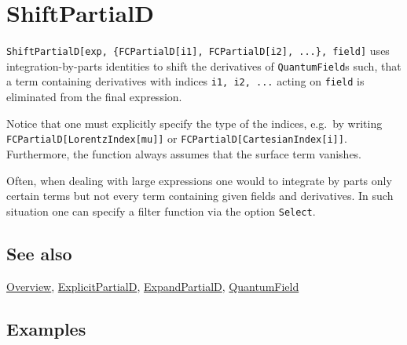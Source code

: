 \documentclass[../FeynCalcManual.tex]{subfiles}
\begin{document}
\hypertarget{shiftpartiald}{
\section{ShiftPartialD}\label{shiftpartiald}}

\texttt{ShiftPartialD[\allowbreak{}exp,\ \allowbreak{}\{\allowbreak{}FCPartialD[\allowbreak{}i1],\ \allowbreak{}FCPartialD[\allowbreak{}i2],\ \allowbreak{}...\},\ \allowbreak{}field]}
uses integration-by-parts identities to shift the derivatives of
\texttt{QuantumField}s such, that a term containing derivatives with
indices \texttt{i1,\ \allowbreak{}i2,\ \allowbreak{}...} acting on
\texttt{field} is eliminated from the final expression.

Notice that one must explicitly specify the type of the indices, e.g.~by
writing \texttt{FCPartialD[\allowbreak{}LorentzIndex[\allowbreak{}mu]]}
or \texttt{FCPartialD[\allowbreak{}CartesianIndex[\allowbreak{}i]]}.
Furthermore, the function always assumes that the surface term vanishes.

Often, when dealing with large expressions one would to integrate by
parts only certain terms but not every term containing given fields and
derivatives. In such situation one can specify a filter function via the
option \texttt{Select}.

\subsection{See also}

\hyperlink{toc}{Overview},
\hyperlink{explicitpartiald}{ExplicitPartialD},
\hyperlink{expandpartiald}{ExpandPartialD},
\hyperlink{quantumfield}{QuantumField}

\subsection{Examples}

\begin{Shaded}
\begin{Highlighting}[]
\ExtensionTok{=}\OperatorTok{[}\OperatorTok{,}\OperatorTok{[}\OperatorTok{]]}\OperatorTok{[}\OperatorTok{[} 
    \OperatorTok{]]}\OperatorTok{[}\SpecialCharTok{\textbackslash{}}\OperatorTok{[}\OperatorTok{]]}\OperatorTok{[}\OperatorTok{[}\OperatorTok{]]}\OperatorTok{[}\OperatorTok{,}\OperatorTok{[}\OperatorTok{]]}
\end{Highlighting}
\end{Shaded}
\end{document}
